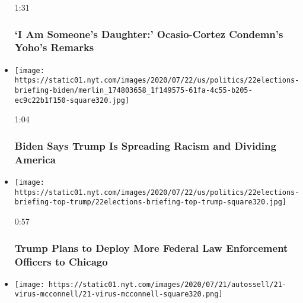 \begin{itemize}
  1:31

  \hypertarget{i-am-someones-daughter-ocasio-cortez-condemns-yohos-remarks}{%
  \subsubsection{`I Am Someone's Daughter:' Ocasio-Cortez Condemn's
  Yoho's
  Remarks}\label{i-am-someones-daughter-ocasio-cortez-condemns-yohos-remarks}}
\item
  \href{https://www.nytimes.com/video/us/100000007251300/biden-trump-racist-divide-america.html?action=click\&module=video-series-bar\&region=header\&pgtype=Article\&playlistId=video/us-politics}{}

  \texttt{[image: https://static01.nyt.com/images/2020/07/22/us/politics/22elections-briefing-biden/merlin\_174803658\_1f149575-61fa-4c55-b205-ec9c22b1f150-square320.jpg]}

  1:04

  \hypertarget{biden-says-trump-is-spreading-racism-and-dividing-america}{%
  \subsubsection{Biden Says Trump Is Spreading Racism and Dividing
  America}\label{biden-says-trump-is-spreading-racism-and-dividing-america}}
\item
  \href{https://www.nytimes.com/video/us/100000007251764/trump-surge-federal-law-enforcment.html?action=click\&module=video-series-bar\&region=header\&pgtype=Article\&playlistId=video/us-politics}{}

  \texttt{[image: https://static01.nyt.com/images/2020/07/22/us/politics/22elections-briefing-top-trump/22elections-briefing-top-trump-square320.jpg]}

  0:57

  \hypertarget{trump-plans-to-deploy-more-federal-law-enforcement-officers-to-chicago}{%
  \subsubsection{Trump Plans to Deploy More Federal Law Enforcement
  Officers to
  Chicago}\label{trump-plans-to-deploy-more-federal-law-enforcement-officers-to-chicago}}
\item
  \href{https://www.nytimes.com/video/us/100000007250230/mcconnell-proposal-relief-package.html?action=click\&module=video-series-bar\&region=header\&pgtype=Article\&playlistId=video/us-politics}{}

  \texttt{[image: https://static01.nyt.com/images/2020/07/21/autossell/21-virus-mcconnell/21-virus-mcconnell-square320.png]}


\end{itemize}
